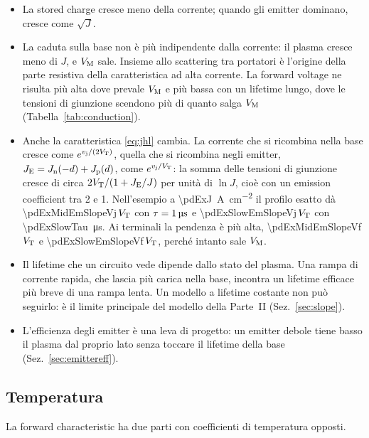\documentclass[10pt,a4paper]{scrartcl}
\let\newcommand\pdvaluedefine
\newcommand{\vj}{v_\mathrm{j}}
\newcommand{\VT}{V_\mathrm{T}}
\newcommand{\Jn}{J_\mathrm{n}}
\newcommand{\Jp}{J_\mathrm{p}}
\newcommand{\VM}{V_\mathrm{M}}
\begin{document}
\begin{itemize}
\item La stored charge cresce meno della corrente; quando gli emitter dominano, cresce come $\sqrt{J}$.
\item La caduta sulla base non è più indipendente dalla corrente: il plasma cresce meno di $J$, e $\VM$ sale. Insieme allo scattering tra portatori è l'origine della parte resistiva della caratteristica ad alta corrente. La forward voltage ne risulta più alta dove prevale $\VM$ e più bassa con un lifetime lungo, dove le tensioni di giunzione scendono più di quanto salga $\VM$ (Tabella~\ref{tab:conduction}).
\item Anche la caratteristica \eqref{eq:jhl} cambia. La corrente che si ricombina nella base cresce come $e^{\vj/(2\VT)}$, quella che si ricombina negli emitter, $J_\mathrm{E} = \Jn(-d) + \Jp(d)$, come $e^{\vj/\VT}$: la somma delle tensioni di giunzione cresce di circa $2\VT/(1 + J_\mathrm{E}/J)$ per unità di $\ln J$, cioè con un emission coefficient tra 2 e 1. Nell'esempio a \SI{\pdExJ}{\ampere\per\centi\metre\squared} il profilo esatto dà \num{\pdExMidEmSlopeVj}\,$\VT$ con $\tau = \SI{1}{\micro\second}$ e \num{\pdExSlowEmSlopeVj}\,$\VT$ con \SI{\pdExSlowTau}{\micro\second}. Ai terminali la pendenza è più alta, \num{\pdExMidEmSlopeVf}\,$\VT$ e \num{\pdExSlowEmSlopeVf}\,$\VT$, perché intanto sale $\VM$.
\item Il lifetime che un circuito vede dipende dallo stato del plasma. Una rampa di corrente rapida, che lascia più carica nella base, incontra un lifetime efficace più breve di una rampa lenta. Un modello a lifetime costante non può seguirlo: è il limite principale del modello della Parte~II (Sez.~\ref{sec:slope}).
\item L'efficienza degli emitter è una leva di progetto: un emitter debole tiene basso il plasma dal proprio lato senza toccare il lifetime della base (Sez.~\ref{sec:emittereff}).
\end{itemize}

\subsection{Temperatura}
\label{sec:temperature}
La forward characteristic ha due parti con coefficienti di temperatura opposti.
\end{document}
